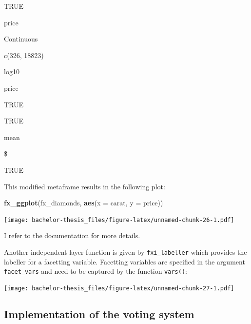 \documentclass[]{report}
\newenvironment{Shaded}{\begin{snugshade}}{\end{snugshade}}
\newcommand{\KeywordTok}[1]{\textcolor[rgb]{0.13,0.29,0.53}{\textbf{#1}}}
\newcommand{\DataTypeTok}[1]{\textcolor[rgb]{0.13,0.29,0.53}{#1}}
\newcommand{\DecValTok}[1]{\textcolor[rgb]{0.00,0.00,0.81}{#1}}
\newcommand{\StringTok}[1]{\textcolor[rgb]{0.31,0.60,0.02}{#1}}
\newcommand{\OperatorTok}[1]{\textcolor[rgb]{0.81,0.36,0.00}{\textbf{#1}}}
\newcommand{\NormalTok}[1]{#1}
\theoremstyle{definition}
\theoremstyle{definition}
\theoremstyle{definition}
\theoremstyle{remark}
\begin{document}
TRUE

price

Continuous

c(326, 18823)

log10

price

TRUE

TRUE

mean

\$

TRUE

This modified metaframe results in the following plot:

\begin{Shaded}
\begin{Highlighting}[]
\KeywordTok{fx_ggplot}\NormalTok{(fx_diamonds, }\KeywordTok{aes}\NormalTok{(}\DataTypeTok{x =}\NormalTok{ carat, }\DataTypeTok{y =}\NormalTok{ price))}
\end{Highlighting}
\end{Shaded}

\texttt{[image: bachelor-thesis\_files/figure-latex/unnamed-chunk-26-1.pdf]}

I refer to the documentation for more details.

Another independent layer function is given by \texttt{fxi\_labeller}
which provides the labeller for a facetting variable. Facetting
variables are specified in the argument \texttt{facet\_vars} and need to
be captured by the function \texttt{vars()}:

\begin{Shaded}
\end{Shaded}

\texttt{[image: bachelor-thesis\_files/figure-latex/unnamed-chunk-27-1.pdf]}

\subsection{Implementation of the voting
system}\label{implementation-of-the-voting-system}
\end{document}
